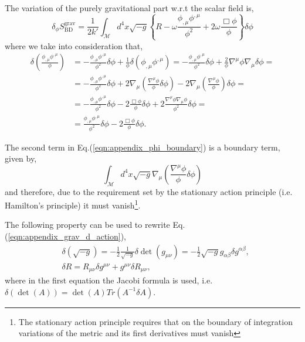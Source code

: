 The variation of the purely gravitational part w.r.t the scalar field is,
\begin{equation}
    \delta_\phi S_{\mathrm{BD}}^{\mathrm{grav}}=\frac{1}{2k'}\int_{\mathcal{M}} d^4x\sqrt{-g}\left\{ R-\omega\frac{\phi_{,\mu}\phi^{,\mu}}{\phi^2}+2\omega\frac{\Box\phi}{\phi}\right\}\delta\phi
    \label{eqn:appendix_delta_phi}
\end{equation}
where we take into consideration that,
\begin{align}
    \delta\left(\frac{\phi_{,\mu}\phi^{,\mu}}{\phi}\right)&=-\frac{\phi_{,\mu}\phi^{,\mu}}{\phi^2}\delta\phi+\frac{1}{\phi}\delta\left(\phi_{,\mu}\phi^{,\mu}\right)=-\frac{\phi_{,\mu}\phi^{,\mu}}{\phi^2}\delta\phi+\frac{2}{\phi}\nabla^\mu\phi\nabla_\mu \delta\phi=\\
    &=-\frac{\phi_{,\mu}\phi^{,\mu}}{\phi^2}\delta\phi+2\nabla_\mu\left(\frac{\nabla^\mu\phi}{\phi}\delta\phi\right)-2\nabla_\mu\left(\frac{\nabla^\mu\phi}{\phi}\right)\delta\phi=\label{eqn:appendix_phi_boundary}\\
    &=-\frac{\phi_{,\mu}\phi^{,\mu}}{\phi^2}\delta\phi-2\frac{\Box\phi}{\phi}\delta\phi+2\frac{\nabla^\mu\phi\nabla_\mu\phi}{\phi^2}\delta\phi=\\
    &=\frac{\phi_{,\mu}\phi^{,\mu}}{\phi^2}\delta\phi-2\frac{\Box\phi}{\phi}\delta\phi.
\end{align}

The second term in Eq.(\ref{eqn:appendix_phi_boundary}) is a boundary term, given by,
\begin{equation}
    \int_{\mathcal{M}}d^4x\sqrt{-g}\nabla_\mu\left(\frac{\nabla^\mu\phi}{\phi}\delta\phi\right)
\end{equation}
and therefore, due to the requirement set by the stationary action principle (i.e. Hamilton's principle) it must vanish\footnote{The stationary action principle requires that on the boundary of integration variations of the metric and its first derivatives must vanish}.



The following property can be used to rewrite Eq.(\ref{eqn:appendix_grav_d_action}), 
\begin{align}
    &\delta\left(\sqrt{-g}\right)=-\frac{1}{2}\frac{1}{\sqrt{-g}}\delta\det(g_{\mu\nu})=-\frac{1}{2}\sqrt{-g}g_{\alpha\beta}\delta g^{\alpha\beta},\\
    &\delta R=R_{\mu\nu}\delta g^{\mu\nu}+g^{\mu\nu}\delta R_{\mu\nu},
\end{align}
where in the first equation the Jacobi formula is used, i.e. $\delta(\det(A))=\det(A)Tr\left(A^{-1}\delta A\right)$. 

